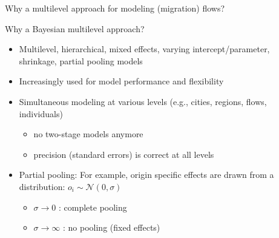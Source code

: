 \documentclass{beamer}
\begin{document}
\begin{frame}[fragile]{Why a \alert{multilevel} approach for modeling (migration) flows?}
\begin{description}
\begin{figure}
	\end{figure}
\end{description}
\end{frame}

\begin{frame}{Why a \alert{Bayesian} multilevel approach?}
\begin{itemize}
	\item \alert{Multilevel}, hierarchical, mixed effects, varying intercept/parameter, shrinkage, partial pooling models\pause
	\item Increasingly used for model \alert{performance} and \alert{flexibility} \pause
    \item \alert{Simultaneous} modeling at various levels (e.g., cities, regions, flows, individuals) 
    \begin{itemize}
    	\item no two-stage models anymore 
    	\item precision (standard errors) is correct \alert{at all levels}\pause
    \end{itemize}
	\item \alert{Partial pooling}: For example, origin specific effects are drawn from a distribution: $o_{i} \sim  \mathcal{N}(0, \sigma)$
	\begin{itemize}
		\item $\sigma \longrightarrow 0$ : complete pooling
		\item $\sigma \longrightarrow \infty$ : no pooling (fixed effects)
	\end{itemize}
\end{itemize}
\end{frame}
\end{document}
